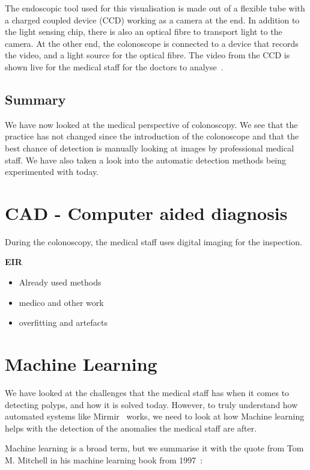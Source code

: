 The endoscopic tool used for this visualisation is made out of a flexible tube with a charged coupled device (CCD) working as a camera at the end. In addition to the light sensing chip, there is also an optical fibre to transport light to the camera. At the other end, the colonoscope is connected to a device that records the video, and a light source for the optical fibre. The video from the CCD is shown live for the medical staff for the doctors to analyse~\cite{Colonoscope}.


\subsection{Summary}
We have now looked at the medical perspective of colonoscopy. We see that the practice has not changed since the introduction of the colonoscope and that the best chance of detection is manually looking at images by professional medical staff. We have also taken a look into the automatic detection methods being experimented with today.


\section{CAD - Computer aided diagnosis}
\label{cha:CAD}
During the colonoscopy, the medical staff uses digital imaging for the inspection. 

\textbf{EIR}


\begin{itemize}
    \item Already used methods
    \item medico and other work
    \item overfitting and artefacts
\end{itemize}

    

\section{Machine Learning}
We have looked at the challenges that the medical staff has when it comes to detecting polyps, and how it is solved today.
However, to truly understand how automated systems like Mirmir~\cite{Steven2018MimirPaper}  works, we need to look at how Machine learning helps with the detection of the anomalies the medical staff are after.  

Machine learning is a broad term, but we summarise it with the quote from  Tom M. Mitchell in his machine learning book from 1997~\cite{MitchellTomM1997Ml}:\\
\vspace{10px}

